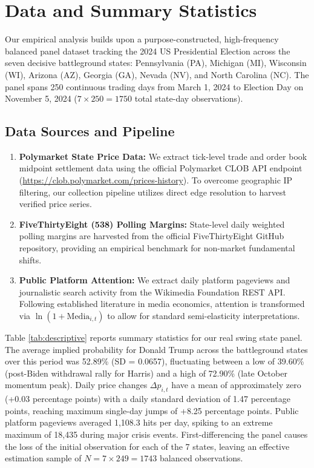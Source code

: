 \documentclass[12pt, a4paper]{article}
\newcommand{\result}[2]{#2}
\begin{document}
\section{Data and Summary Statistics}
\label{sec:data}

Our empirical analysis builds upon a purpose-constructed, high-frequency balanced panel dataset tracking the 2024 US Presidential Election across the seven decisive battleground states: Pennsylvania (PA), Michigan (MI), Wisconsin (WI), Arizona (AZ), Georgia (GA), Nevada (NV), and North Carolina (NC). The panel spans 250 continuous trading days from March 1, 2024 to Election Day on November 5, 2024 ($7 \times 250 = \result{main.n_total}{1750}$ total state-day observations).

\subsection{Data Sources and Pipeline}
\begin{enumerate}
    \item \textbf{Polymarket State Price Data:} We extract tick-level trade and order book midpoint settlement data using the official Polymarket CLOB API endpoint (\url{https://clob.polymarket.com/prices-history}). To overcome geographic IP filtering, our collection pipeline utilizes direct edge resolution to harvest verified price series.
    \item \textbf{FiveThirtyEight (538) Polling Margins:} State-level daily weighted polling margins are harvested from the official FiveThirtyEight GitHub repository, providing an empirical benchmark for non-market fundamental shifts.
    \item \textbf{Public Platform Attention:} We extract daily platform pageviews and journalistic search activity from the Wikimedia Foundation REST API. Following established literature in media economics, attention is transformed via $\ln(1 + \text{Media}_{i,t})$ to allow for standard semi-elasticity interpretations.
\end{enumerate}



Table \ref{tab:descriptive} reports summary statistics for our real swing state panel. The average implied probability for Donald Trump across the battleground states over this period was 52.89\% (SD = 0.0657), fluctuating between a low of 39.60\% (post-Biden withdrawal rally for Harris) and a high of 72.90\% (late October momentum peak). Daily price changes $\Delta p_{i,t}$ have a mean of approximately zero (+0.03 percentage points) with a daily standard deviation of 1.47 percentage points, reaching maximum single-day jumps of +8.25 percentage points. Public platform pageviews averaged 1,108.3 hits per day, spiking to an extreme maximum of 18,435 during major crisis events. First-differencing the panel causes the loss of the initial observation for each of the 7 states, leaving an effective estimation sample of $N = 7 \times 249 = \result{main.n_obs}{1743}$ balanced observations.
\end{document}
